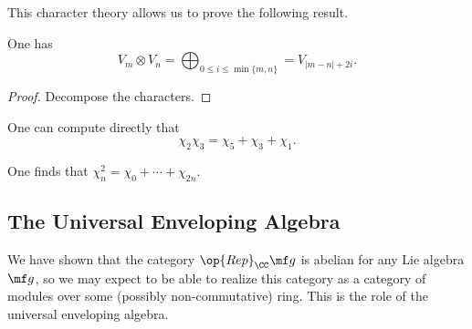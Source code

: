 \documentclass[../notes.tex]{subfiles}
\begin{document}
This character theory allows us to prove the following result.
\begin{theorem}
	One has
	\[V_m\otimes V_n=\bigoplus_{0\le i\le\min\{m,n\}}=V_{\left|m-n\right|+2i}.\]
\end{theorem}
\begin{proof}
	Decompose the characters.
\end{proof}
\begin{example}
	One can compute directly that
	\[\chi_2\chi_3=\chi_5+\chi_3+\chi_1.\]
\end{example}
\begin{example}
	One finds that $\chi_n^2=\chi_0+\cdots+\chi_{2n}$.
\end{example}

\subsection{The Universal Enveloping Algebra}
We have shown that the category $\op{Rep}_\CC\mf g$ is abelian for any Lie algebra $\mf g$, so we may expect to be able to realize this category as a category of modules over some (possibly non-commutative) ring. This is the role of the universal enveloping algebra.
\end{document}
